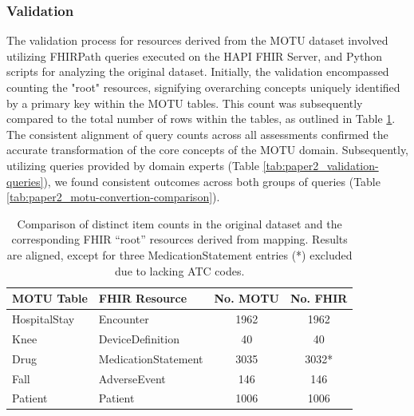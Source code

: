 \subsubsection{Validation}
The validation process for resources derived from the MOTU dataset involved utilizing FHIRPath queries executed on the HAPI FHIR Server, and Python scripts for analyzing the original dataset. Initially, the validation encompassed counting the "root" resources, signifying overarching concepts uniquely identified by a primary key within the MOTU tables. This count was subsequently compared to the total number of rows within the tables, as outlined in Table \ref{tab:paper2_motu-convertion-results}. The consistent alignment of query counts across all assessments confirmed the accurate transformation of the core concepts of the MOTU domain. 
Subsequently, utilizing queries provided by domain experts (Table \ref{tab:paper2_validation-queries}), we found consistent outcomes across both groups of queries (Table \ref{tab:paper2_motu-convertion-comparison}).



\begin{table}[htbp]
\centering
\begin{tabular}{llcc}
\toprule
\textbf{MOTU Table} & \textbf{FHIR Resource} & \textbf{No. MOTU} & \textbf{No. FHIR} \\ \midrule
HospitalStay & Encounter & 1962 & 1962 \\ \midrule
Knee & DeviceDefinition & 40 & 40 \\ \midrule
Drug & MedicationStatement & 3035 & 3032* \\ \midrule
Fall & AdverseEvent & 146 & 146 \\ \midrule
Patient & Patient & 1006 & 1006 \\ \bottomrule
\end{tabular}%
\caption{Comparison of distinct item counts in the original dataset and the corresponding FHIR “root” resources derived from mapping. Results are aligned, except for three MedicationStatement entries (*) excluded due to lacking ATC codes.}
\label{tab:paper2_motu-convertion-results}
\end{table}

